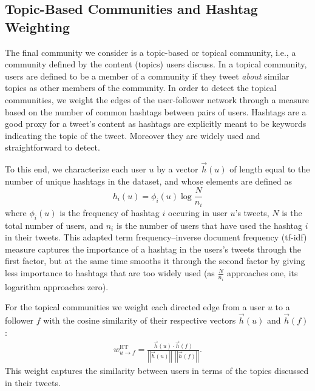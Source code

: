 
\subsection{Topic-Based Communities and Hashtag Weighting}
\label{sec:method-topic}

The final community we consider is a topic-based or topical community, i.e., a community defined by the content (topics) users discuss. In a topical community, users are defined to be a member of a community if they tweet \emph{about} similar topics as other members of the community. 
In order to detect the topical communities, we weight the edges of the user-follower network through a measure based on the number of common hashtags between pairs of users. Hashtags are a good proxy for a tweet's content as hashtags are explicitly meant to be keywords indicating the topic of the tweet. Moreover they are widely used and straightforward to detect. 

To this end, we characterize each user $u$ by a vector $\vec{h}(u)$ of length equal to the number of unique hashtags in the dataset, and whose elements are defined as
\begin{equation}
h_i(u) = \phi_i(u)\log{ \frac{N}{n_i} }
\end{equation}
where $\phi_i(u)$ is the frequency of hashtag $i$ occuring in user $u$'s tweets, $N$ is the total number of users, and $n_i$ is the number of users that have used the hashtag $i$ in their tweets. This adapted term frequency--inverse document frequency (tf-idf) measure \cite{salton_introduction_1983} captures the importance of a hashtag in the users's tweets through the first factor, but at the same time smooths it through the second factor by giving less importance to hashtags that are too widely used (as $\frac{N}{n_i}$ approaches one, its logarithm approaches zero). 

For the topical communities we weight each directed edge from a user $u$ to a follower $f$ with the cosine similarity of their respective vectors $\vec{h}(u)$ and $\vec{h}(f)$:
\begin{align}
	w_{u \to f}^{\text{HT}} = \frac{\vec{h}(u) \cdot \vec{h}(f)}{\left|\left|\vec{h}(u)\right|\right| \ \ \left|\left|\vec{h}(f)\right|\right|}. \label{Eqn-EW-topic}
\end{align}
This weight captures the similarity between users in terms of the topics discussed in their tweets. 
